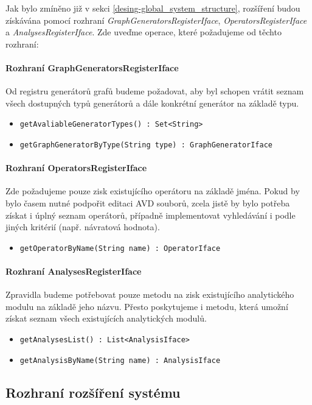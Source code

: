 Jak bylo zmíněno již v sekci \ref{desing-global_system_structure}, rozšíření budou získávána pomocí rozhraní \emph{GraphGeneratorsRegisterIface}, \emph{OperatorsRegisterIface} a \emph{AnalysesRegisterIface}. Zde uveďme operace, které požadujeme od těchto rozhraní:

\paragraph{Rozhraní GraphGeneratorsRegisterIface} Od registru generátorů grafů budeme požadovat, aby byl schopen vrátit seznam všech dostupných typů generátorů a dále konkrétní generátor na základě typu.
\begin{itemize}
\item \verb-getAvaliableGeneratorTypes() : Set<String>-
\item \verb-getGraphGeneratorByType(String type) : GraphGeneratorIface-
\end{itemize}

\paragraph{Rozhraní OperatorsRegisterIface}
Zde požadujeme pouze zisk existujícího operátoru na základě jména. Pokud by bylo časem nutné podpořit editaci AVD souborů, zcela jistě by bylo potřeba získat i úplný seznam operátorů, případně implementovat vyhledávání i podle jiných kritérií (např. návratová hodnota).

\begin{itemize}
\item \verb-getOperatorByName(String name) : OperatorIface-
\end{itemize}

\paragraph{Rozhraní AnalysesRegisterIface} Zpravidla budeme potřebovat pouze metodu na zisk existujícího analytického modulu na základě jeho názvu. Přesto poskytujeme i metodu, která umožní získat seznam všech existujících analytických modulů.

\begin{itemize}
\item \verb-getAnalysesList() : List<AnalysisIface>-
\item \verb-getAnalysisByName(String name) : AnalysisIface-
\end{itemize}

\subsection{Rozhraní rozšíření systému}

